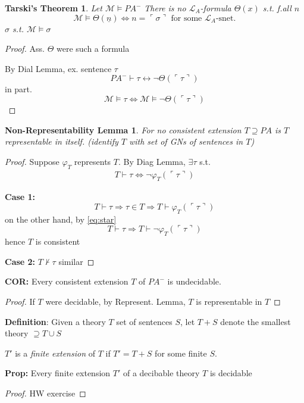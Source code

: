 \documentclass[12pt]{article}
\newcommand{\proves}{\vdash}
\newcommand{\gn}[1]{\ulcorner #1 \urcorner}
\newcommand{\defn}{\textbf{Definition}: }
\begin{document}
\newtheorem*{tarski}{Tarski's Theorem}
\begin{tarski}
  Let $\mathcal{M} \models PA^-$
  There is no $\mathcal{L}_A$-formula $\Theta(x)$ s.t. f.all $n$
  \[
  \mathcal{M} \models \Theta(\underline{n}) \Leftrightarrow n = \gn{\sigma}
  \text{ for some $\mathcal{L}_A$-snet.}
  \]
  $\sigma$ s.t. $\mathcal{M} \models \sigma$
\end{tarski}
\begin{proof}
  Ass. $\Theta$ were such a formula

  By Dial Lemma, ex. sentence $\tau$
  \[
  PA^- \proves \tau \leftrightarrow \neg\Theta(\gn{\tau})
  \]
  in part.
  \[
  \mathcal{M} \models \tau \Leftrightarrow \mathcal{M} \models \neg\Theta(\gn{\tau})
  \]
\end{proof}

\newtheorem*{nonrep}{Non-Representability Lemma}
\begin{nonrep}
  For no consistent extension $T\supseteq PA$ is $T$ representable in itself.
  (identify $T$ with set of GNs of sentences in $T$)
\end{nonrep}
\begin{proof}
  Suppose $\varphi_T$ represents $T$.
  By Diag Lemma, $\exists \tau$ s.t. 
  \begin{align}
    \label{eq:star}
  T \proves \tau \Leftrightarrow \neg\varphi_T(\gn{\tau})
  \end{align}

  \textbf{Case 1:}
  \[
  T \proves \tau \Rightarrow \tau \in T \Rightarrow T \proves \varphi_T(\gn{\tau})
  \]
  on the other hand, by \ref{eq:star}
  \[
  T \proves \tau \Rightarrow T \proves \neg \varphi_T(\gn{\tau})
  \]
  hence $T$ is consistent

  \textbf{Case 2:} $T \not\proves \tau$
  similar
\end{proof}

\textbf{COR:} Every consistent extension $T$ of $PA^-$ is undecidable.
\begin{proof}
  If $T$ were decidable, by Represent. Lemma,
  $T$ is representable in $T$
\end{proof}

\defn Given a theory $T$ set of sentences $S$,
        let $T+S$ denote the smallest theory $\supseteq T \cup S$

 $T'$ is a \emph{finite extension} of $T$ if $T' = T+S$
 for some finite $S$.

\textbf{Prop:} Every finite extension $T'$ of a decibable theory $T$ is
decidable
\begin{proof}
  HW exercise
\end{proof}
\end{document}
